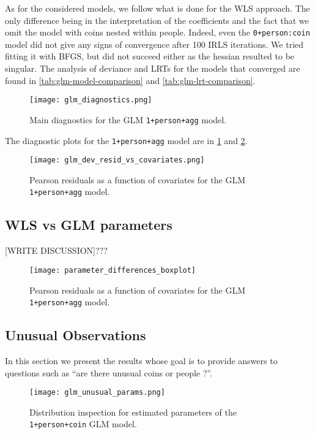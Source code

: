 \documentclass[a4paper, 12pt,oneside]{article}
\begin{document}
			As for the considered models, we follow what is done for the WLS approach. The only difference being in the interpretation of the coefficients and the fact that we omit the model with coins nested within people. Indeed, even the \texttt{0+person:coin} model did not give any signs of convergence after 100 IRLS iterations. We tried fitting it with BFGS, but did not succeed either as the hessian resulted to be singular. The analysis of deviance and LRTs for the models that converged are found in \ref{tab:glm-model-comparison} and \ref{tab:glm-lrt-comparison}.
			\begin{figure}[htb]
				\centering
				\texttt{[image: glm\_diagnostics.png]}
				\caption{Main diagnostics for the GLM \texttt{1+person+agg} model.}
				\label{fig:glm-diagnostic}
			\end{figure}

			The diagnostic plots for the \texttt{1+person+agg} model are in \ref{fig:glm-diagnostic} and \ref{fig:dev-resid-vs-covariates}. 
			\begin{figure}[htb]
				\vspace{-1em}
				\centering
				\texttt{[image: glm\_dev\_resid\_vs\_covariates.png]}
				\caption{Pearson residuals as a function of covariates for the GLM \texttt{1+person+agg} model.}
				\label{fig:dev-resid-vs-covariates}
			\end{figure}	
		
		\subsection{WLS vs GLM parameters}
		[WRITE DISCUSSION]???

		\begin{figure}[htb]
			\vspace{-1em}
			\centering
			\texttt{[image: parameter\_differences\_boxplot]}
			\caption{Pearson residuals as a function of covariates for the GLM \texttt{1+person+agg} model.}
			\label{fig:parameter_differences_boxplot}
		\end{figure}



		\subsection{Unusual Observations}
		In this section we present the results whose goal is to provide answers to questions such as ``are there unusual coins or people ?''. 
		\begin{figure}[h!]%
			\centering
			\texttt{[image: glm\_unusual\_params.png]}
			\caption{Distribution inspection for estimated parameters of the \texttt{1+person+coin} GLM model.}
			\label{fig:unusual-params}
		\end{figure}
\end{document}
